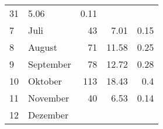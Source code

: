 \begin{longtable}{lXrrr}
       \num{31} &
       \num[round-mode=places,round-precision=2]{5.06} &
         \num[round-mode=places,round-precision=2]{0.11} \\

     7 &
     \multicolumn{1}{X}{ Juli   } &


       \num{43} &
       \num[round-mode=places,round-precision=2]{7.01} &
         \num[round-mode=places,round-precision=2]{0.15} \\

     8 &
     \multicolumn{1}{X}{ August   } &


       \num{71} &
       \num[round-mode=places,round-precision=2]{11.58} &
         \num[round-mode=places,round-precision=2]{0.25} \\

     9 &
     \multicolumn{1}{X}{ September   } &


       \num{78} &
       \num[round-mode=places,round-precision=2]{12.72} &
         \num[round-mode=places,round-precision=2]{0.28} \\

     10 &
     \multicolumn{1}{X}{ Oktober   } &


       \num{113} &
       \num[round-mode=places,round-precision=2]{18.43} &
         \num[round-mode=places,round-precision=2]{0.4} \\

     11 &
     \multicolumn{1}{X}{ November   } &


       \num{40} &
       \num[round-mode=places,round-precision=2]{6.53} &
         \num[round-mode=places,round-precision=2]{0.14} \\

     12 &
     \multicolumn{1}{X}{ Dezember   } &



\end{longtable}

